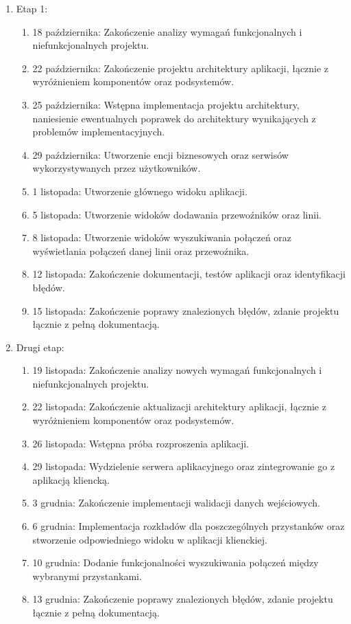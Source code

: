 \documentclass[10pt,a4paper]{article}
\begin{document}
\begin{enumerate}
	\bfseries
	\item Etap 1:
	\begin{enumerate}
		\mdseries
		\item 18 października: Zakończenie analizy wymagań funkcjonalnych i niefunkcjonalnych projektu.
		\item 22 października: Zakończenie projektu architektury aplikacji, łącznie z wyróżnieniem komponentów oraz podsystemów.
		\item 25 października: Wstępna implementacja projektu architektury, naniesienie ewentualnych poprawek do architektury wynikających z problemów implementacyjnych.
		\item 29 października: Utworzenie encji biznesowych oraz serwisów wykorzystywanych przez użytkowników.
		\item 1 listopada: Utworzenie głównego widoku aplikacji.
		\item 5 listopada: Utworzenie widoków dodawania przewoźników oraz linii.
		\item 8 listopada: Utworzenie widoków wyszukiwania połączeń oraz wyświetlania połączeń danej linii oraz przewoźnika.
		\item 12 listopada: Zakończenie dokumentacji, testów aplikacji oraz identyfikacji błędów.
		\item 15 listopada: Zakończenie poprawy znalezionych błędów, zdanie projektu łącznie z pełną dokumentacją.
	\end{enumerate}
	\item Drugi etap:
	\begin{enumerate}
		\mdseries
		\item 19 listopada: Zakończenie analizy nowych wymagań funkcjonalnych i niefunkcjonalnych projektu.
		\item 22 listopada: Zakończenie aktualizacji architektury aplikacji, łącznie z wyróżnieniem komponentów oraz podsystemów.
		\item 26 listopada: Wstępna próba rozproszenia aplikacji.
		\item 29 listopada: Wydzielenie serwera aplikacyjnego oraz zintegrowanie go z aplikacją kliencką.
		\item 3 grudnia: Zakończenie implementacji walidacji danych wejściowych.
		\item 6 grudnia: Implementacja rozkładów dla poszczególnych przystanków oraz stworzenie odpowiedniego widoku w aplikacji klienckiej.
		\item 10 grudnia: Dodanie funkcjonalności wyszukiwania połączeń między wybranymi przystankami.
		\item 13 grudnia: Zakończenie poprawy znalezionych błędów, zdanie projektu łącznie z pełną dokumentacją.
	\end{enumerate}
\end{enumerate}
\end{document}
